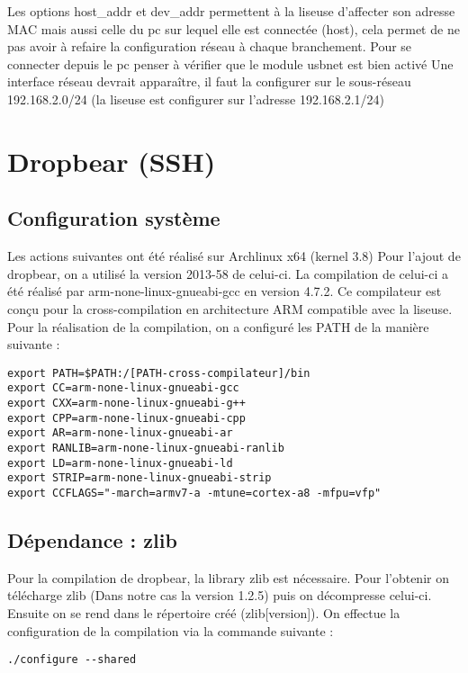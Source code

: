 Les options host_addr et dev_addr permettent à la liseuse d'affecter son adresse MAC mais aussi celle du pc sur lequel elle est connectée (host), cela permet de ne pas avoir à refaire la configuration réseau à chaque branchement.	
	Pour se connecter depuis le pc penser à vérifier que le module usbnet est bien activé	
	Une interface réseau devrait apparaître, il faut la configurer sur le sous-réseau 192.168.2.0/24 (la liseuse est configurer sur l'adresse 192.168.2.1/24)
	
\section{Dropbear (SSH)}	

\subsection{Configuration système}

Les actions suivantes ont été réalisé sur Archlinux x64 (kernel 3.8)
Pour l'ajout de dropbear, on a utilisé la version 2013-58 de celui-ci. La compilation de celui-ci a été réalisé par arm-none-linux-gnueabi-gcc en version 4.7.2. Ce compilateur est conçu pour la cross-compilation en architecture ARM compatible avec la liseuse. 
Pour la réalisation de la compilation, on a configuré les PATH de la manière suivante : 

\begin{lstlisting}
export PATH=$PATH:/[PATH-cross-compilateur]/bin
export CC=arm-none-linux-gnueabi-gcc
export CXX=arm-none-linux-gnueabi-g++
export CPP=arm-none-linux-gnueabi-cpp
export AR=arm-none-linux-gnueabi-ar
export RANLIB=arm-none-linux-gnueabi-ranlib
export LD=arm-none-linux-gnueabi-ld
export STRIP=arm-none-linux-gnueabi-strip
export CCFLAGS="-march=armv7-a -mtune=cortex-a8 -mfpu=vfp"
\end{lstlisting}

\subsection{Dépendance : zlib}
Pour la compilation de dropbear, la library zlib est nécessaire.
Pour l'obtenir on télécharge zlib (Dans notre cas la version 1.2.5) puis on décompresse celui-ci. Ensuite on se rend dans le répertoire créé (zlib[version]). On effectue la configuration de la compilation via la commande suivante :

\begin{lstlisting}
./configure --shared
\end{lstlisting}

